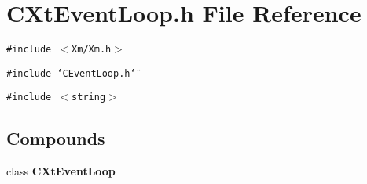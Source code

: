 \section{CXt\-Event\-Loop.h File Reference}
\label{CXtEventLoop_8h}
{\tt \#include $<$Xm/Xm.h$>$}\par
{\tt \#include \char`\"{}CEvent\-Loop.h\char`\"{}}\par
{\tt \#include $<$string$>$}\par
\subsection*{Compounds}
\begin{CompactItemize}
\item 
class {\bf CXt\-Event\-Loop}
\end{CompactItemize}
